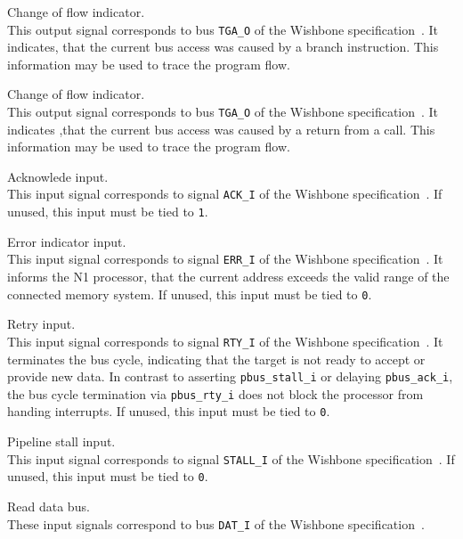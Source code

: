 \begin{description}[style=nextline]
\item[\texttt{pbus\_tga\_cof\_bra\_o}] Change of flow indicator. \\   
  This output signal corresponds to bus \texttt{TGA\_O} of the Wishbone specification~\cite{wishbone}.
  It indicates, that the current bus access was caused by a \gls{branch} instruction.
  This information may be used to trace the program flow.

\item[\texttt{pbus\_tga\_cof\_eow\_o}] Change of flow indicator. \\   
  This output signal corresponds to bus \texttt{TGA\_O} of the Wishbone specification~\cite{wishbone}.
  It indicates ,that the current bus access was caused by a return from a \gls{call}.
  This information may be used to trace the program flow.

\item[\texttt{pbus\_ack\_i}] Acknowlede input. \\   
  This input signal corresponds to signal \texttt{ACK\_I} of the Wishbone specification~\cite{wishbone}.
  If unused, this input must be tied to \texttt{1}.

\item[\texttt{pbus\_err\_i}] Error indicator input. \\  
  This input signal corresponds to signal \texttt{ERR\_I} of the Wishbone specification~\cite{wishbone}.
  It informs the N1 processor, that the current address exceeds the valid range of the connected
  memory system. 
  If unused, this input must be tied to \texttt{0}.
  
\item[\texttt{pbus\_rty\_i}] Retry input. \\  
  This input signal corresponds to signal \texttt{RTY\_I} of the Wishbone specification~\cite{wishbone}.
  It terminates the bus cycle, indicating that the target is not ready to accept or provide new data.
  In contrast to asserting \texttt{pbus\_stall\_i} or delaying \texttt{pbus\_ack\_i}, the bus cycle termination
  via \texttt{pbus\_rty\_i} does not block the processor from handing interrupts.
  If unused, this input must be tied to \texttt{0}.
  
\item[\texttt{pbus\_stall\_i}] Pipeline stall input. \\
  This input signal corresponds to signal \texttt{STALL\_I} of the Wishbone specification~\cite{wishbone}.
  If unused, this input must be tied to \texttt{0}.

\item[\texttt{pbus\_dat\_i}] Read data bus. \\ 
  These input signals correspond to bus \texttt{DAT\_I} of the Wishbone specification~\cite{wishbone}.

\end{description}


